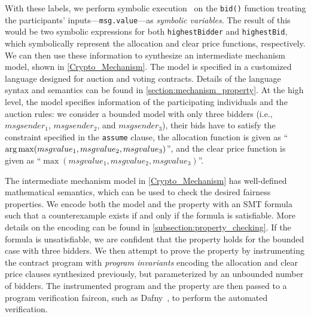 With these labels, we perform symbolic execution~\cite{king1976symbolic} on the \texttt{bid()}
function treating the participants' inputs---\texttt{msg.value}---as \emph{symbolic variables}.
The result of this would be two symbolic expressions for both \texttt{highestBidder} and
\texttt{highestBid}, which symbolically represent the allocation and clear price functions,
respectively.
We can then use these information to synthesize an intermediate mechanism model, shown in
\cref{Crypto_Mechanism}.
The model is specified in a customized language designed for auction and voting contracts.
Details of the language syntax and semantics can be found in \cref{section:mechanism_property}.
At the high level, the model specifies information of the participating individuals and the auction
rules: we consider a bounded model with only three bidders (i.e., $msgsender_1$, $msgsender_2$, and
$msgsender_3$), their bids have to satisfy the constraint specified in the \texttt{assume} clause,
the allocation function is given as ``$\operatorname*{arg\,max}(msgvalue_1,\allowbreak msgvalue_2,\allowbreak
msgvalue_3)$'', and the clear price function is given as ``$\max(msgvalue_1,\allowbreak
msgvalue_2,\allowbreak msgvalue_3)$''.


The intermediate mechanism model in \cref{Crypto_Mechanism} has well-defined mathematical
semantics, which can be used to check the desired fairness properties.
We encode both the model and the property with an SMT formula such that a counterexample exists if
and only if the formula is satisfiable.
More details on the encoding can be found in \cref{subsection:property_checking}.
If the formula is unsatisfiable, we are confident that the property holds for the bounded case with
three bidders.
We then attempt to prove the property by instrumenting the contract program with \emph{program
	invariants} encoding the allocation and clear price clauses synthesized previously, but
parameterized by an unbounded number of bidders.
The instrumented program and the property are then passed to a program verification faircon, such as
Dafny~\cite{dafny}, to perform the automated verification.

